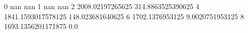 0 nan nan
1 nan nan
2 2008.02197265625 314.8863525390625
4 1841.1593017578125 148.023681640625
6 1702.1376953125 9.0020751953125
8 1693.1356201171875 0.0
